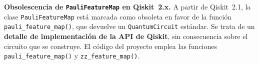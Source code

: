 \textbf{Obsolescencia de \texttt{PauliFeatureMap} en Qiskit~2.x.} A partir de Qiskit~2.1, la clase
\texttt{PauliFeatureMap} está marcada como obsoleta en favor de la función \texttt{pauli\_feature\_map()}, que devuelve un
\texttt{QuantumCircuit} estándar. Se trata de un \textbf{detalle de implementación de la API de Qiskit}, sin consecuencia
sobre el circuito que se construye. El código del proyecto emplea las funciones \texttt{pauli\_feature\_map()} y
\texttt{zz\_feature\_map()}.
